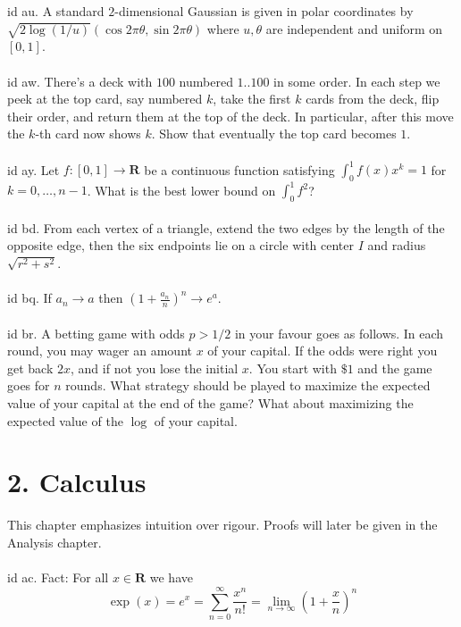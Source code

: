 \documentclass[oneside]{book}
\newcommand{\R}{\mathbf{R}}
\newcommand{\fit}[1]{\left( #1\right)}
\newcommand\chap[1]{%
  \chapter*{#1}%
  \addcontentsline{toc}{chapter}{#1}}
\begin{document}
id au. A standard $2$-dimensional Gaussian is given in polar coordinates by $\sqrt{2\log(1/u)}(\cos2\pi\theta,\sin2\pi\theta)$ where $u,\theta$ are independent and uniform on $[0,1]$. \\\\

id aw. There's a deck with $100$ numbered $1..100$ in some order. In each step we peek at the top card, say numbered $k$, take the first $k$ cards from the deck, flip their order, and return them at the top of the deck. In particular, after this move the $k$-th card now shows $k$. Show that eventually the top card becomes $1$.  \\\\


id ay. Let $f:[0,1]\to\R$ be a continuous function satisfying $\int_0^1 f(x)x^k=1$ for $k=0,\dots,n-1$. What is the best lower bound on $\int_0^1 f^2$? \\\\


id bd. From each vertex of a triangle, extend the two edges by the length of the opposite edge, then the six endpoints lie on a circle with center $I$ and radius $\sqrt{r^2+s^2}$. \\\\


id bq. If $a_n\to a$ then $\fit{1+\frac{a_n}{n}}^n\to e^a$. \\\\


id br. A betting game with odds $p>1/2$ in your favour goes as follows. In each round, you may wager an amount $x$ of your capital. If the odds were right you get back $2x$, and if not you lose the initial $x$. You start with $\$1$ and the game goes for $n$ rounds. What strategy should be played to maximize the expected value of your capital at the end of the game? What about maximizing the expected value of the $\log$ of your capital.



\newpage
\chap{2. Calculus}
This chapter emphasizes intuition over rigour. Proofs will later be given in the Analysis chapter.   \\\\


id ac. Fact: For all $x\in\R$ we have $$\exp(x)=e^x=\sum_{n=0}^\infty \frac{x^n}{n!} = \lim_{n\to\infty}\fit{1+\frac{x}{n}}^n$$     \\\\
\end{document}

